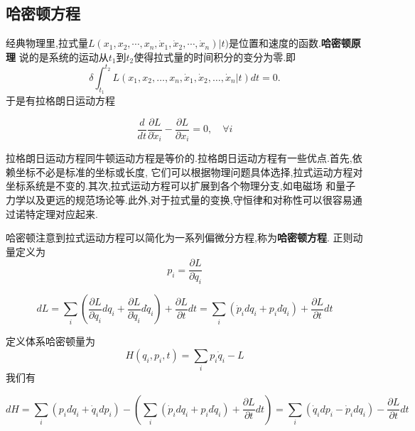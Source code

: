 \subsection{哈密顿方程}
经典物理里,拉式量$L(x_1, x_2, \cdots, x_n, \dot{x}_1, \dot{x}_2, \cdots, \dot{x}_n)|t)$是位置和速度的函数.\textbf{哈密顿原理}
说的是系统的运动从$t_1$到$t_2$使得拉式量的时间积分的变分为零.即
\begin{equation}
    \delta \int_{t_1}^{t_2} L\left(x_1, x_2, \ldots, x_n, \dot{x}_1, \dot{x}_2, \ldots, \dot{x}_n | t\right) d t=0 .
\end{equation}
于是有拉格朗日运动方程

\begin{equation}
    \frac{d}{d t} \frac{\partial L}{\partial \dot{x}_i}-\frac{\partial L}{\partial x_i}=0, \quad \forall i
\end{equation}

拉格朗日运动方程同牛顿运动方程是等价的.拉格朗日运动方程有一些优点.首先,依赖坐标不必是标准的坐标或长度,
它们可以根据物理问题具体选择,拉式运动方程对坐标系统是不变的.其次,拉式运动方程可以扩展到各个物理分支,如电磁场
和量子力学以及更远的规范场论等.此外,对于拉式量的变换,守恒律和对称性可以很容易通过诺特定理对应起来.


哈密顿注意到拉式运动方程可以简化为一系列偏微分方程,称为\textbf{哈密顿方程}.
正则动量定义为
\begin{equation}
    p_i=\frac{\partial L}{\partial \dot{q}_i}
\end{equation}

\begin{equation}
    d L=\sum_i\left(\frac{\partial L}{\partial q_i} d q_i+\frac{\partial L}{\partial \dot{q}_i} d \dot{q}_i\right)+\frac{\partial L}{\partial t} d t=\sum_i\left(\dot{p}_i d q_i+p_i d \dot{q}_i\right)+\frac{\partial L}{\partial t} d t
\end{equation}

定义体系哈密顿量为
\begin{equation}
    H(q_i, p_i, t)=\sum_i p_i \dot{q}_i-L 
\end{equation}
我们有

\begin{equation}
    d H=\sum_i\left(p_i d \dot{q}_i+\dot{q}_i d p_i\right)-\left(\sum_i\left(\dot{p}_i d q_i+p_i d \dot{q}_i\right)+\frac{\partial L}{\partial t} d t\right)=\sum_i\left(\dot{q}_i d p_i-\dot{p}_i d q_i\right)-\frac{\partial L}{\partial t} d t
\end{equation}

